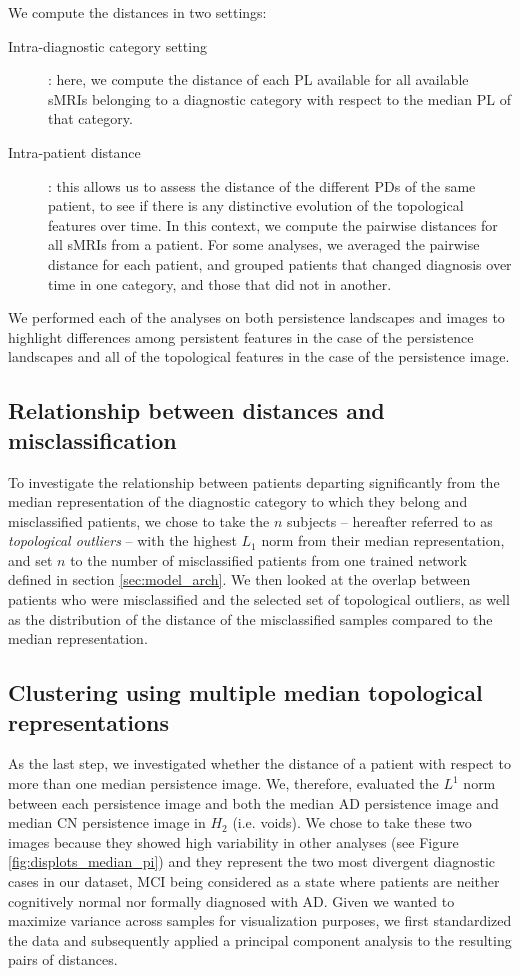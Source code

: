 \documentclass{article}
\begin{document}
We compute the distances in two settings:
\begin{description}
\item[Intra-diagnostic category setting]: here, we compute the distance of each PL available for all
  available sMRIs belonging to a diagnostic category with respect to the median PL of that category.
\item[Intra-patient distance]: this allows us to assess the distance of the different PDs of the
  same patient, to see if there is any distinctive evolution of the topological features over time.
  In this context, we compute the pairwise distances for all sMRIs from a patient. For some
  analyses, we averaged the pairwise distance for each patient, and grouped patients that changed
  diagnosis over time in one category, and those that did not in another.
\end{description}
We performed each of the analyses on both persistence landscapes and images to highlight differences
among persistent features in the case of the persistence landscapes and all of the topological
features in the case of the persistence image.

\subsection{Relationship between distances and misclassification}

To investigate the relationship between patients departing significantly from the median
representation of the diagnostic category to which they belong and misclassified patients, we chose
to take the $n$ subjects -- hereafter referred to as \emph{topological outliers} -- with the highest
$L_1$ norm from their median representation, and set $n$ to the number of misclassified patients
from one trained network defined in section \ref{sec:model_arch}. We then looked at the overlap
between patients who were misclassified and the selected set of topological outliers, as well as the
distribution of the distance of the misclassified samples compared to the median representation.

\subsection{Clustering using multiple median topological representations}\label{sec:methods_dist_multiple_images}

As the last step, we investigated whether the distance of a patient with respect to more than one
median persistence image. We, therefore, evaluated the $L^1$ norm between each persistence image and
both the median AD persistence image and median CN persistence image in $H_2$ (i.e. voids). We chose
to take these two images because they showed high variability in other analyses (see Figure
\ref{fig:displots_median_pi}) and they represent the two most divergent diagnostic cases in our
dataset, MCI being considered as a state where patients are neither cognitively normal nor formally
diagnosed with AD. Given we wanted to maximize variance across samples for visualization purposes,
we first standardized the data and subsequently applied a principal component analysis to the
resulting pairs of distances.
\end{document}
